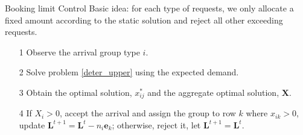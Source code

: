       \begin{frame}{Booking limit Control}
        Basic idea: for each type of requests, we only allocate a fixed amount according to the static solution and reject all other exceeding requests.
        \begin{itemize}
          \item[1] Observe the arrival group type $i$.
          \item[2] Solve problem \eqref{deter_upper} using the expected demand.
          \item[3] Obtain the optimal solution, $x_{ij}^{*}$ and the aggregate optimal solution, $\mathbf{X}$.
          \item[4] If $X_{i} > 0$, accept the arrival and assign the group to row $k$ where $x_{ik} > 0$, update $\mathbf{L}^{t+1} = \mathbf{L}^{t} - n_i \mathbf{e}_{k}$; otherwise, reject it, let $\mathbf{L}^{t+1} = \mathbf{L}^{t}$.
        \end{itemize}
                 
      \end{frame}


      